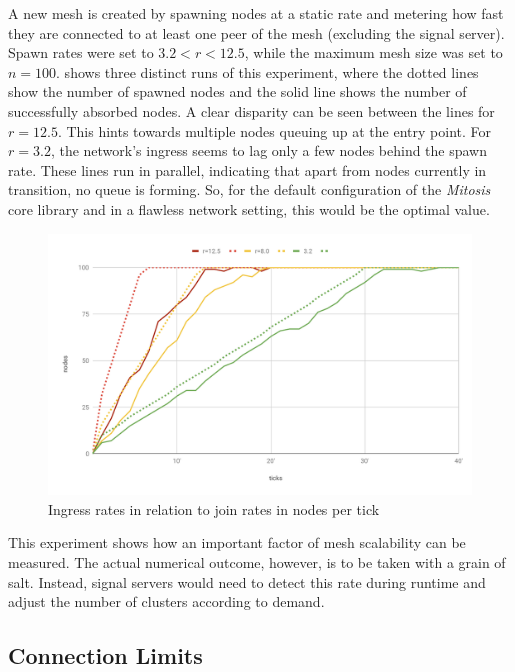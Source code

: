 A new mesh is created by spawning nodes at a static rate and metering how fast they are connected to at least one peer of the mesh (excluding the signal server). Spawn rates were set to $3.2<r<12.5$, while the maximum mesh size was set to $n=100$.  shows three distinct runs of this experiment, where the dotted lines show the number of spawned nodes and the solid line shows the number of successfully absorbed nodes. A clear disparity can be seen between the lines for $r=12.5$. This hints towards multiple nodes queuing up at the entry point. For $r=3.2$, the network's ingress seems to lag only a few nodes behind the spawn rate. These lines run in parallel, indicating that apart from nodes currently in transition, no queue is forming. So, for the default configuration of the \textit{Mitosis} core library and in a flawless network setting, this would be the optimal value.

\begin{figure}[htb!]
\centering
\includegraphics[width=1.0\textwidth]{graphics/analysis/ingress-final.pdf}
\caption{Ingress rates in relation to join rates in nodes per tick}
\label{fig:ingress-rates}
\end{figure}

This experiment shows how an important factor of mesh scalability can be measured. The actual numerical outcome, however, is to be taken with a grain of salt. Instead, signal servers would need to detect this rate during runtime and adjust the number of clusters according to demand.


\subsection{Connection Limits}

